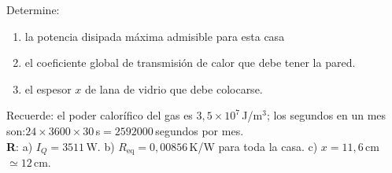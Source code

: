 \documentclass[a4paper,12pt]{article}
\begin{document}
\begin{enumerate}
		Determine:
		\begin{enumerate}
			\item la potencia disipada máxima admisible para esta casa
			\item el coeficiente global de transmisión de calor que debe tener
				la pared.
			\item el espesor $x$ de lana de vidrio que debe colocarse.
		\end{enumerate}
		Recuerde: el poder calorífico del gas es $3,5\times 10^7$\,J/m$^3$; los
		segundos en un mes son:$24\times3600\times30$\,s$=2592000$\,segundos
		por mes.
		\\{\bf{R}}: a) $I_Q=3511$\,W. b) $R_{\mathrm{eq}}=0,00856$\,K/W para
		toda la casa. c) $x=11,6$\,cm$\simeq 12$\,cm.
\end{enumerate}
\end{document}
